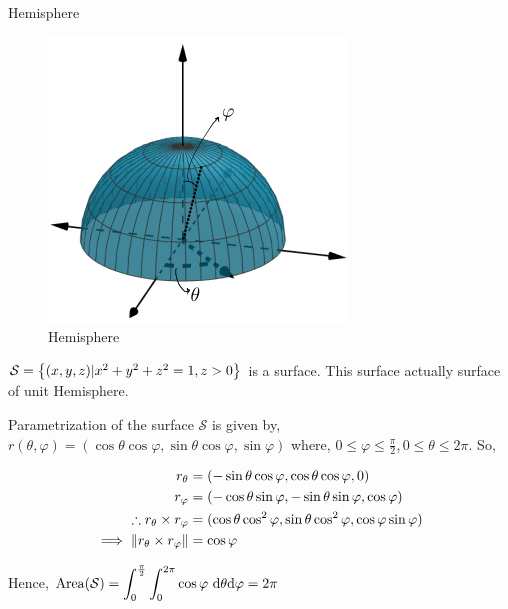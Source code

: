 \documentclass[../Analysis-3]{subfiles}
\begin{document}
\begin{Eg}{Hemisphere}{}

    \begin{figure}
        \centering
        \includegraphics[width=.78\linewidth]{../figures/lec-26.2.png}
        \caption{Hemisphere}
    \end{figure}

    $\mathcal{S} = \qty{(x,y,z) | x^2+y^2+z^2 = 1, z >0 }$ is a surface. This surface actually surface of unit Hemisphere.

    Parametrization of the surface $\mathcal{S}$ is given by, $r(\theta, \varphi) = (\cos \theta \cos \varphi, \sin \theta \cos \varphi, \sin \varphi)$ where, $0 \le \varphi \le \frac{\pi}{2}, 0 \le \theta \le 2\pi$. So,

    \begin{align*}
        r_{\theta}                                    & = (-\sin \theta \cos \varphi, \cos \theta \cos \varphi, 0)                              \\
        r_{\varphi}                                   & = (-\cos \theta \sin \varphi,-\sin \theta \sin \varphi, \cos \varphi)                   \\
        \therefore r_{\theta} \times r_{\varphi}      & = (\cos \theta \cos ^2 \varphi, \sin \theta \cos ^2\varphi, \cos \varphi  \sin \varphi) \\
        \implies \norm{r_{\theta} \times r_{\varphi}} & = \cos \varphi
    \end{align*}

    Hence, $\displaystyle\operatorname{Area}(\mathcal{S}) = \int_{0}^{\frac{\pi}{2}}\int_{0}^{2\pi} \cos \varphi\ \dd \theta \dd \varphi = 2\pi$

\end{Eg}
\end{document}
